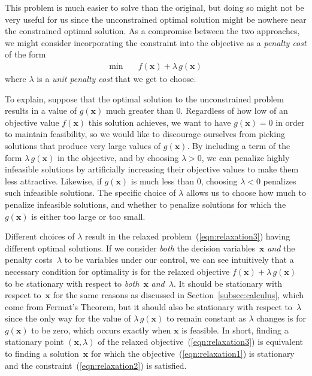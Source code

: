 \documentclass[11pt]{article}
\theoremstyle{definition} %
\begin{document}
This problem is much easier to solve than the original, but doing so might not be very useful for us since the unconstrained optimal solution might be nowhere near the constrained optimal solution. As a compromise between the two approaches, we might consider incorporating the constraint into the objective as a \textit{penalty cost} of the form
\begin{align}
	\label{eqn:relaxation3} \min \quad& f(\mathbf{x}) + \lambda \, g(\mathbf{x})
\end{align}
where $\lambda$ is a \textit{unit penalty cost} that we get to choose.

To explain, suppose that the optimal solution to the unconstrained problem results in a value of $g(\mathbf{x})$ much greater than $0$. Regardless of how low of an objective value $f(\mathbf{x})$ this solution achieves, we want to have $g(\mathbf{x}) = 0$ in order to maintain feasibility, so we would like to discourage ourselves from picking solutions that produce very large values of $g(\mathbf{x})$. By including a term of the form $\lambda \, g(\mathbf{x})$ in the objective, and by choosing $\lambda > 0$, we can penalize highly infeasible solutions by artificially increasing their objective values to make them less attractive. Likewise, if $g(\mathbf{x})$ is much less than $0$, choosing $\lambda < 0$ penalizes such infeasible solutions. The specific choice of $\lambda$ allows us to choose how much to penalize infeasible solutions, and whether to penalize solutions for which the $g(\mathbf{x})$ is either too large or too small.

Different choices of $\lambda$ result in the relaxed problem~(\ref{eqn:relaxation3}) having different optimal solutions. If we consider \textit{both} the decision variables~$\mathbf{x}$ \textit{and} the penalty costs~$\lambda$ to be variables under our control, we can see intuitively that a necessary condition for optimality is for the relaxed objective $f(\mathbf{x}) + \lambda \, g(\mathbf{x})$ to be stationary with respect to \textit{both}~$\mathbf{x}$ \textit{and}~$\lambda$. It should be stationary with respect to~$\mathbf{x}$ for the same reasons as discussed in Section~\ref{subsec:calculus}, which come from Fermat's Theorem, but it should also be stationary with respect to~$\lambda$ since the only way for the value of $\lambda \, g(\mathbf{x})$ to remain constant as $\lambda$ changes is for $g(\mathbf{x})$ to be zero, which occurs exactly when $\mathbf{x}$ is feasible. In short, finding a stationary point $(\mathbf{x},\lambda)$ of the relaxed objective~(\ref{eqn:relaxation3}) is equivalent to finding a solution~$\mathbf{x}$ for which the objective~(\ref{eqn:relaxation1}) is stationary and the constraint~(\ref{eqn:relaxation2}) is satisfied.
\end{document}
